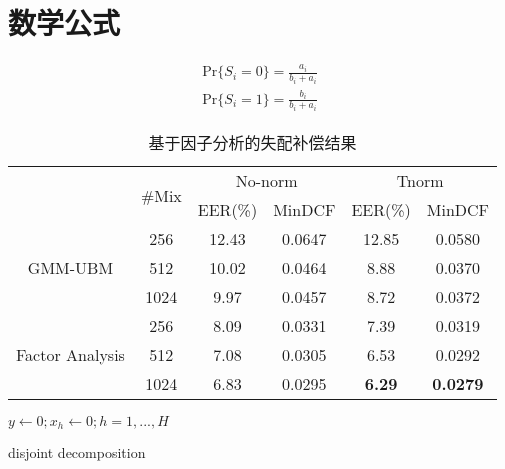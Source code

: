 ﻿
\chapter{数学公式}
\label{chap:math}
\begin{equation}
\begin{split}
\mbox{Pr}\{S_i=0\}=\frac{a_i}{b_i+a_i} \\
\mbox{Pr}\{S_i=1\}=\frac{b_i}{b_i+a_i} \label{1}
\end{split}
\end{equation}
\cite{lshort-cn}


\begin{table}[htbp]
\centering
\caption{基于因子分析的失配补偿结果}\label{tab:jfa-gmm-ubm}
\begin{tabular}{cccccc}
    \toprule
    &\multirow{2}{*}{\#Mix}&\multicolumn{2}{c}{No-norm}
    &\multicolumn{2}{c}{Tnorm}\\
    \cline{3-4} \cline{5-6}
		&		& EER(\%) 	& MinDCF & EER(\%) 	& MinDCF\\
    \midrule
	\multirow{3}{*}{GMM-UBM}
    &256 		& 12.43 	& 0.0647	& 12.85    & 0.0580\\
    &512 		& 10.02 	& 0.0464	& 8.88 	   & 0.0370\\
    &1024 		& 9.97 	    & 0.0457	& 8.72 	   & 0.0372\\
    \midrule
	\multirow{3}{*}{Factor Analysis}
    &256 		& 8.09 	& 0.0331 	& 7.39 	& 0.0319\\
    &512 		& 7.08 	& 0.0305 	& 6.53 	& 0.0292\\
    &1024 		& 6.83 	& 0.0295 	& \textbf{6.29} 	& \textbf{0.0279}\\
 \bottomrule
\end{tabular}
\end{table}



\IncMargin{1em}
\begin{algorithm}
\BlankLine
\emph{$y\leftarrow 0;$$x_h\leftarrow 0;$$h=1,...,H$ }\;
\caption{disjoint decomposition}\label{algo_disjdecomp}
\end{algorithm}\DecMargin{1em}